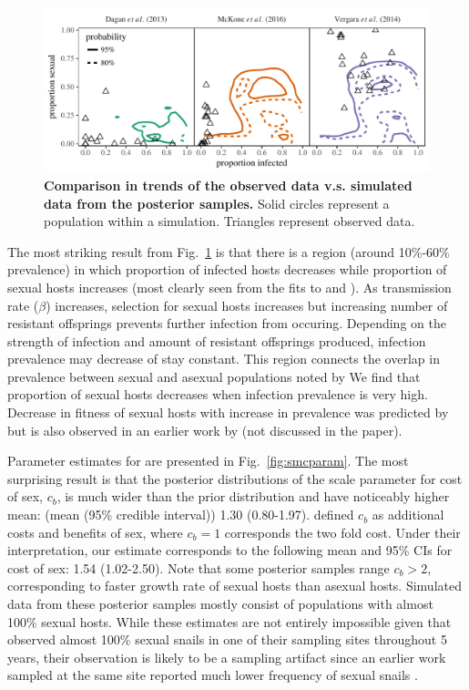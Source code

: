 \documentclass{article}\usepackage[]{graphicx}\usepackage[]{color}
\newcommand{\fref}[1]{Fig.~\ref{fig:#1}}
\begin{document}
\begin{figure}[!ht]
\includegraphics[width=\textwidth]{../fig/simulated_data.pdf}
\caption{{\bf Comparison in trends of the observed data v.s. simulated data from the posterior samples.}
Solid circles represent a population within a simulation. Triangles represent observed data.}
\label{fig:ivs}
\end{figure}

The most striking result from \fref{ivs} is that there is a region (around 10\%-60\% prevalence) in which proportion of infected hosts decreases while proportion of sexual hosts increases (most clearly seen from the fits to \cite{mckone2016fine} and \cite{vergara2014infection}).
As transmission rate ($\beta$) increases, selection for sexual hosts increases but increasing number of resistant offsprings prevents further infection from occuring. 
Depending on the strength of infection and amount of resistant offsprings produced, infection prevalence may decrease of stay constant.
This region connects the overlap in prevalence between sexual and asexual populations noted by \cite{lively2001trematode}
We find that proportion of sexual hosts decreases when infection prevalence is very high.
Decrease in fitness of sexual hosts with increase in prevalence was predicted by \cite{ashby2015diversity} but is also observed in an earlier work by \cite{lively2010epidemiological} (not discussed in the paper).

Parameter estimates for \cite{vergara2014infection} are presented in \fref{smcparam}.
The most surprising result is that the posterior distributions of the scale parameter for cost of sex, $c_b$, is much wider than the prior distribution and have noticeably higher mean: (mean (95\% credible interval)) 1.30 (0.80-1.97).
\cite{ashby2015diversity} defined $c_b$ as additional costs and benefits of sex, where $c_b=1$ corresponds the two fold cost.
Under their interpretation, our estimate corresponds to the following mean and 95\% CIs for cost of sex: 1.54 (1.02-2.50).
Note that some posterior samples range $c_b > 2$, corresponding to faster growth rate of sexual hosts than asexual hosts.
Simulated data from these posterior samples mostly consist of populations with almost 100\% sexual hosts.
While these estimates are not entirely impossible given that \cite{vergara2014infection} observed almost 100\% sexual snails in one of their sampling sites throughout 5 years, their observation is likely to be a sampling artifact since an earlier work sampled at the same site reported much lower frequency of sexual snails \citep{vergara2013geographic}. %
\end{document}
